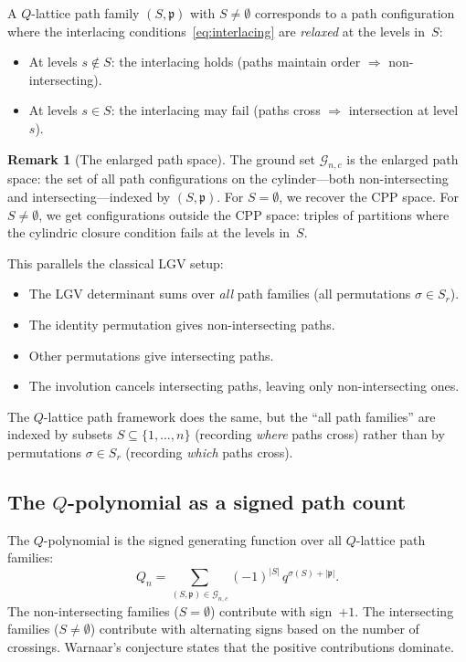 \documentclass[11pt]{article}
\theoremstyle{plain}
\theoremstyle{definition}
\newtheorem{remark}[theorem]{Remark}
\begin{document}
A $Q$-lattice path family $(S, \mathfrak{p})$ with
$S \neq \emptyset$ corresponds to a path configuration where the
interlacing conditions~\eqref{eq:interlacing} are
\emph{relaxed} at the levels in~$S$:
\begin{itemize}
  \item At levels $s \notin S$: the interlacing holds
    (paths maintain order $\Rightarrow$ non-intersecting).
  \item At levels $s \in S$: the interlacing may fail
    (paths cross $\Rightarrow$ intersection at level~$s$).
\end{itemize}

\begin{remark}[The enlarged path space]
\label{rem:enlarged}
The ground set $\mathcal{G}_{n,c}$ is the enlarged path
space: the set of all path configurations on the cylinder---both
non-intersecting and intersecting---indexed by
$(S, \mathfrak{p})$.  For $S = \emptyset$, we recover the CPP
space.  For $S \neq \emptyset$, we get configurations outside
the CPP space: triples of partitions where the cylindric closure
condition fails at the levels in~$S$.

This parallels the classical LGV setup:
\begin{itemize}
  \item The LGV determinant sums over \emph{all} path families
    (all permutations $\sigma \in S_r$).
  \item The identity permutation gives non-intersecting paths.
  \item Other permutations give intersecting paths.
  \item The involution cancels intersecting paths, leaving
    only non-intersecting ones.
\end{itemize}
The $Q$-lattice path framework does the same, but the ``all path
families'' are indexed by subsets $S \subseteq \{1, \ldots, n\}$
(recording \emph{where} paths cross) rather than by permutations
$\sigma \in S_r$ (recording \emph{which} paths cross).
\end{remark}


\subsection{The $Q$-polynomial as a signed path count}

The $Q$-polynomial is the signed generating function over
all $Q$-lattice path families:
\begin{equation}\label{eq:Q-signed}
  \boxed{\;
  Q_n = \sum_{(S, \mathfrak{p}) \in \mathcal{G}_{n,c}}
    (-1)^{|S|}\, q^{\sigma(S) + |\mathfrak{p}|}.
  \;}
\end{equation}
The non-intersecting families ($S = \emptyset$) contribute
with sign~$+1$.  The intersecting families
($S \neq \emptyset$) contribute with alternating signs based
on the number of crossings.  Warnaar's conjecture states
that the positive contributions dominate.
\end{document}
